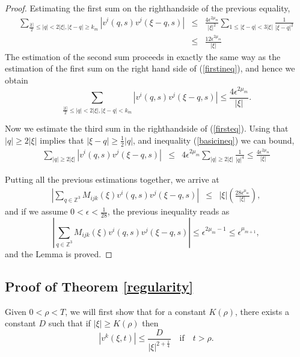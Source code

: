 \documentclass{amsart}
\begin{document}
\begin{proof}
Estimating the first sum on the righthandside of the previous equality,
\begin{eqnarray*}
\sum_{\frac{\left|\xi\right|}{2}\leq \left|q\right|<2\left|\xi\right|,\left|\xi-q\right|\geq k_m}
\left|v^i\left(q,s\right)v^j\left(\xi-q,s\right)\right|
&\leq&
\frac{4\epsilon^{2\mu_m}}{\left|\xi\right|^2}\sum_{1\leq\left|\xi-q\right|<3\left|\xi\right|}
\frac{1}{\left|\xi-q\right|^2}\\
&\leq& \frac{12\epsilon^{2\mu_m}}{\left|\xi\right|}
\end{eqnarray*}
The estimation of the second sum proceeds in exactly
the same way as the estimation of the first sum
on the right hand side of (\ref{firstineq}), and hence we obtain
\begin{equation*}
\sum_{\frac{\left|\xi\right|}{2}\leq \left|q\right|<2\left|\xi\right|,\left|\xi-q\right|<k_m}
\left|v^i\left(q,s\right)v^j\left(\xi-q,s\right)\right|
\leq \frac{4\epsilon^{2\mu_m}}{\left|\xi\right|}.
\end{equation*}

Now we estimate the third sum in the righthandside of (\ref{firsteq}). Using that
$\left|q\right|\geq 2\left|\xi\right|$ implies that $\left|\xi-q\right|\geq \frac{1}{2}\left|q\right|$,
and inequality (\ref{basicineq})
we can bound,
\begin{eqnarray*}
\sum_{\left|q\right|\geq 2\left|\xi\right|}
\left|v^i\left(q,s\right)v^j\left(\xi-q,s\right)\right|&\leq&
4\epsilon^{2\mu_m}\sum_{\left|q\right|\geq 2\left|\xi\right|}\frac{1}{\left|q\right|^4}
\leq \frac{4\epsilon^{2\mu_m}}{\left|\xi\right|}
\end{eqnarray*}

Putting all the previous estimations together, we arrive at
\begin{eqnarray*}
\left|\sum_{q\in\mathbb{Z}^3}M_{ijk}\left(\xi\right)v^i\left(q,s\right)v^j\left(\xi-q,s\right)\right|
&\leq& \left|\xi\right|\left(\frac{28\epsilon^{\mu_m}}{\left|\xi\right|}\right),
\end{eqnarray*}
and if we assume $0<\epsilon<\frac{1}{28}$, the previous inequality reads as
\begin{equation*}
\left|\sum_{q\in\mathbb{Z}^3}M_{ijk}\left(\xi\right)v^i\left(q,s\right)v^j\left(\xi-q,s\right)\right|
\leq \epsilon^{2\mu_m-1}\leq \epsilon^{\mu_{m+1}},
\end{equation*}
and the Lemma is proved.
\end{proof}


\subsection{Proof of Theorem \ref{regularity}} 
Given $0<\rho<T$, we will first show that for a constant $K\left(\rho\right)$, there exists
a constant $D$ such that if $\left|\xi\right|\geq K\left(\rho\right)$ then
\[
\left|v^k\left(\xi, t\right)\right|\leq\frac{D}{\left|\xi\right|^{2+\frac{1}{4}}}\quad
\mbox{if}\quad t>\rho.
\]
\end{document}
